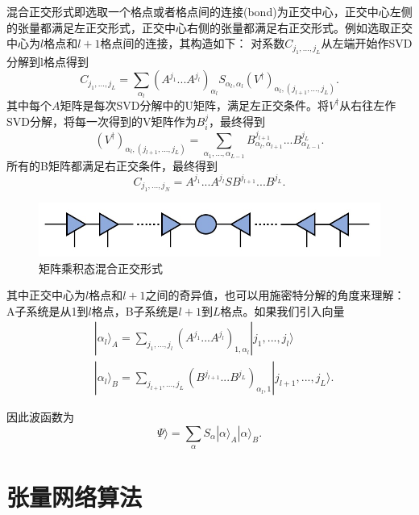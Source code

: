 \documentclass[12pt]{article}
\begin{document}
       混合正交形式即选取一个格点或者格点间的连接(bond)为正交中心，正交中心左侧的张量都满足左正交形式，正交中心右侧的张量都满足右正交形式。例如选取正交中心为$l$格点和$l+1$格点间的连接，其构造如下\cite{vanderstraeten2019tangent}：
       对系数$C_{j_1,...,j_L}$从左端开始作SVD分解到l格点得到
       \begin{equation}C_{j_1,...,j_L}=\sum_{\alpha_l}(A^{j_1}...A^{j_l})_{\alpha_l}S_{\alpha_l,\alpha_l}(V^\dagger)_{\alpha_l,(j_{l+1},...,j_L)}.\end{equation}
       其中每个$A$矩阵是每次SVD分解中的U矩阵，满足左正交条件。将$V^\dagger$从右往左作SVD分解，将每一次得到的V矩阵作为$B^j_i$，最终得到
       \begin{equation}(V^\dagger)_{\alpha_l,(j_{l+1},...,j_L)}=\sum_{\alpha_1,...,\alpha_{L-1}}B_{\alpha_l,\alpha_{l+1}}^{j_{l+1}}...B_{\alpha_{L-1}}^{j_L}.\end{equation}
       所有的B矩阵都满足右正交条件，最终得到
       \begin{equation}C_{j_1,...,j_N}=A^{j_1}...A^{j_l}SB^{j_{l+1}}...B^{j_L}.\end{equation}
       \begin{figure}[H]
       	\centering
       	\includegraphics[scale=0.7]{7.矩阵乘积态混合正交形式}
       	\caption[9pt]{ 矩阵乘积态混合正交形式}
       	\label{fig:7}
       \end{figure}
       其中正交中心为$l$格点和$l+1$之间的奇异值，也可以用施密特分解的角度来理解：A子系统是从1到$l$格点，B子系统是$l+1$到$L$格点。如果我们引入向量
       \begin{equation}\begin{split} &|\alpha_l\rangle_A=\sum_{j_1,...,j_l}(A^{j_1}...A^{j_l})_{1,\alpha_l}|j_1,...,j_l\rangle
       \\ &|\alpha_l\rangle_B=\sum_{j_{l+1},...,j_L}(B^{j_{l+1}}...B^{j_L})_{\alpha_l,1}|j_{l+1},...,j_L\rangle .\end{split}\end{equation}
       
       因此波函数为\begin{equation}\Psi\rangle=\sum_{\alpha}S_\alpha|\alpha\rangle_A|\alpha\rangle_B.\end{equation}
	   
	\newpage
	{\centering\section{张量网络算法}}
\end{document}
